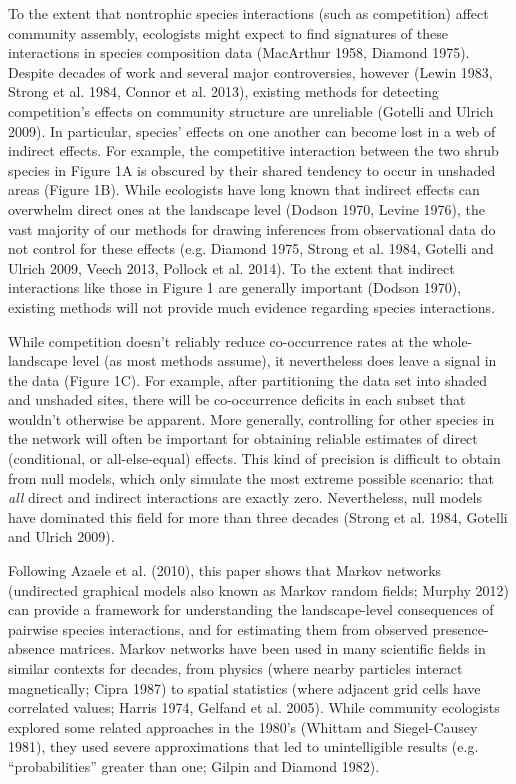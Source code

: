 \documentclass[12pt,]{article}
\begin{document}
\begin{spacing}{1.9}
\begin{flushleft}
\noindent
To the extent that nontrophic species interactions (such as competition)
affect community assembly, ecologists might expect to find signatures of
these interactions in species composition data (MacArthur 1958, Diamond
1975). Despite decades of work and several major controversies, however
(Lewin 1983, Strong et al. 1984, Connor et al. 2013), existing methods
for detecting competition's effects on community structure are
unreliable (Gotelli and Ulrich 2009). In particular, species' effects on
one another can become lost in a web of indirect effects. For example,
the competitive interaction between the two shrub species in Figure 1A
is obscured by their shared tendency to occur in unshaded areas (Figure
1B). While ecologists have long known that indirect effects can
overwhelm direct ones at the landscape level (Dodson 1970, Levine 1976),
the vast majority of our methods for drawing inferences from
observational data do not control for these effects (e.g. Diamond 1975,
Strong et al. 1984, Gotelli and Ulrich 2009, Veech 2013, Pollock et al.
2014). To the extent that indirect interactions like those in Figure 1
are generally important (Dodson 1970), existing methods will not provide
much evidence regarding species interactions.

While competition doesn't reliably reduce co-occurrence rates at the
whole-landscape level (as most methods assume), it nevertheless does
leave a signal in the data (Figure 1C). For example, after partitioning
the data set into shaded and unshaded sites, there will be co-occurrence
deficits in each subset that wouldn't otherwise be apparent. More
generally, controlling for other species in the network will often be
important for obtaining reliable estimates of direct (conditional, or
all-else-equal) effects. This kind of precision is difficult to obtain
from null models, which only simulate the most extreme possible
scenario: that \emph{all} direct and indirect interactions are exactly
zero. Nevertheless, null models have dominated this field for more than
three decades (Strong et al. 1984, Gotelli and Ulrich 2009).

Following Azaele et al. (2010), this paper shows that Markov networks
(undirected graphical models also known as Markov random fields; Murphy
2012) can provide a framework for understanding the landscape-level
consequences of pairwise species interactions, and for estimating them
from observed presence-absence matrices. Markov networks have been used
in many scientific fields in similar contexts for decades, from physics
(where nearby particles interact magnetically; Cipra 1987) to spatial
statistics (where adjacent grid cells have correlated values; Harris
1974, Gelfand et al. 2005). While community ecologists explored some
related approaches in the 1980's (Whittam and Siegel-Causey 1981), they
used severe approximations that led to unintelligible results (e.g.
``probabilities'' greater than one; Gilpin and Diamond 1982).


\end{flushleft}
\end{spacing}
\end{document}

